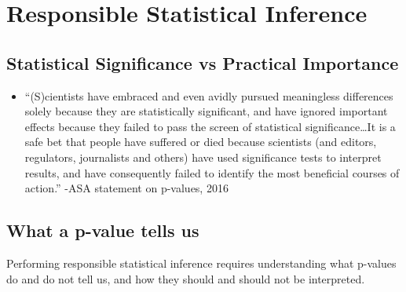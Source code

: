 \documentclass[
  letterpaper,
  DIV=11,
  numbers=noendperiod]{scrreprt}
\providecommand{\tightlist}{%
  \setlength{\itemsep}{0pt}\setlength{\parskip}{0pt}}\usepackage{longtable,booktabs,array}
\begin{document}
\section{Responsible Statistical
Inference}\label{responsible-statistical-inference}

\subsection{Statistical Significance vs Practical
Importance}\label{statistical-significance-vs-practical-importance}

\begin{itemize}
\tightlist
\item
  ``(S)cientists have embraced and even avidly pursued meaningless
  differences solely because they are statistically significant, and
  have ignored important effects because they failed to pass the screen
  of statistical significance\ldots It is a safe bet that people have
  suffered or died because scientists (and editors, regulators,
  journalists and others) have used significance tests to interpret
  results, and have consequently failed to identify the most beneficial
  courses of action.'' -ASA statement on p-values, 2016
\end{itemize}

\subsection{What a p-value tells us}\label{what-a-p-value-tells-us}

Performing responsible statistical inference requires understanding what
p-values do and do not tell us, and how they should and should not be
interpreted.
\end{document}
